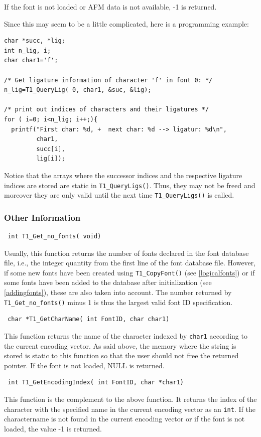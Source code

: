 If the font is not loaded or AFM data is not available, -1 is returned.

Since this may seem to be a little complicated, here is a programming example:
\begin{verbatim}
char *succ, *lig;
int n_lig, i;
char char1='f';

/* Get ligature information of character 'f' in font 0: */
n_lig=T1_QueryLig( 0, char1, &suc, &lig);

/* print out indices of characters and their ligatures */
for ( i=0; i<n_lig; i++;){
  printf("First char: %d, +  next char: %d --> ligatur: %d\n",
         char1,
         succ[i],
         lig[i]);
\end{verbatim}

Notice that the arrays where the successor indices and the respective
ligature indices are stored are static in
\verb+T1_QueryLigs()+. Thus, they may not be freed and moreover they
are only valid until the next time \verb+T1_QueryLigs()+ is called.


\subsubsection{Other Information}
\label{otherinformation}%

\precorr
\begin{verbatim}
 int T1_Get_no_fonts( void)
\end{verbatim}\postcorr
Usually, this function returns the number of fonts declared in the font
database file, i.e., the integer quantity from the first line of the font
database file. However, if some new fonts have been created using
\verb+T1_CopyFont()+ (see \ref{logicalfonts}) or if some fonts have
been added to the database 
after initialization (see \ref{addingfonts}), these are also taken into
account. The number returned by \verb+T1_Get_no_fonts()+ minus 1
is thus the largest valid font ID specification.

\precorr
\begin{verbatim}
 char *T1_GetCharName( int FontID, char char1)
\end{verbatim}\postcorr
This function returns the name of the character indexed by \verb+char1+
according to the current encoding vector. As said above, the memory where the
string 
is stored is static to this function so that the user should not free the
returned pointer. If the font is not loaded, NULL is returned.

\precorr
\begin{verbatim}
 int T1_GetEncodingIndex( int FontID, char *char1)
\end{verbatim}\postcorr
This function is the complement to the above function. It returns the index of
the character with the specified name in the current encoding vector as an
\verb+int+. If the charactername is not found in the current encoding vector
or if the font is not loaded, the value -1 is returned.

